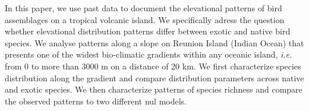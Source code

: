 \documentclass{article}
\begin{document}




In this paper, we use past data to document the elevational patterns of bird assemblages on a tropical volcanic island.  We specifically adress the question whether elevational distribution patterns differ between exotic and native bird species. We analyse patterns along a slope on Reunion Island (Indian Ocean) that presents one of the widest bio-climatic gradients within any oceanic island, \textit{i.e.} from 0 to more than 3000 m on a distance of 20 km. We first characterize species distribution along the gradient and compare distribution parameters across native and exotic species. We then characterize patterns of species richness and compare the observed patterns to two different nul models. 
\end{document}
